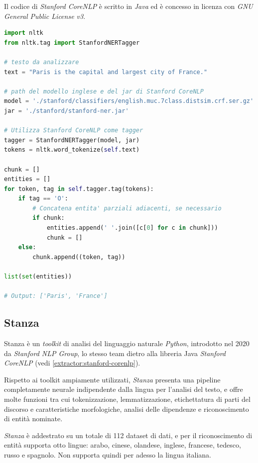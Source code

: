 \documentclass[a4paper,11pt]{article}
\begin{document}
Il codice di \textit{Stanford CoreNLP} è scritto in \textit{Java} ed è concesso in licenza con \textit{GNU General Public License v3}. \cite{stanford}
\newline

\begin{lstlisting}[basicstyle=\small, language=python, frame=single, caption={Esempio di codice Python per l'estrazione di entità con \textit{Stanford CoreNLP}.},captionpos=b]
import nltk
from nltk.tag import StanfordNERTagger

# testo da analizzare
text = "Paris is the capital and largest city of France."

# path del modello inglese e del jar di Stanford CoreNLP
model = './stanford/classifiers/english.muc.7class.distsim.crf.ser.gz'
jar = './stanford/stanford-ner.jar'

# Utilizza Stanford CoreNLP come tagger
tagger = StanfordNERTagger(model, jar)
tokens = nltk.word_tokenize(self.text)

chunk = []
entities = []
for token, tag in self.tagger.tag(tokens):
    if tag == 'O':
        # Concatena entita' parziali adiacenti, se necessario
        if chunk:
            entities.append(' '.join([c[0] for c in chunk]))
            chunk = []
    else:
        chunk.append((token, tag))

list(set(entities))

# Output: ['Paris', 'France']
\end{lstlisting}

\subsection{Stanza}
\label{extractor:stanza}
Stanza è un \textit{toolkit} di analisi del linguaggio naturale \textit{Python}, introdotto nel 2020 da \textit{Stanford NLP Group}, lo stesso team dietro alla libreria Java \textit{Stanford CoreNLP} (vedi \ref{extractor:stanford-corenlp}). \cite{stanza}

Rispetto ai toolkit ampiamente utilizzati, \textit{Stanza} presenta una pipeline completamente neurale indipendente dalla lingua per l'analisi del testo, e offre molte funzioni tra cui tokenizzazione, lemmatizzazione, etichettatura di parti del discorso e caratteristiche morfologiche, analisi delle dipendenze e riconoscimento di entità nominate. 

\textit{Stanza} è addestrato su un totale di 112 dataset di dati, e per il riconoscimento di entità supporta otto lingue: arabo, cinese, olandese, inglese, francese, tedesco, russo e spagnolo. Non supporta quindi per adesso la lingua italiana.
\newline
\end{document}
